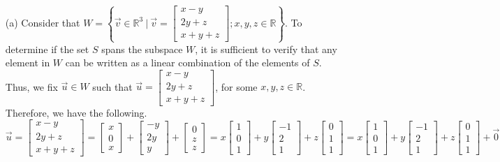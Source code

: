 \begin{SaveQuestion}
\begin{enumerate}
        \begin{itemize}
            \item[(a)] Consider that $W = \left\{\vec v \in \mathbb{R}^3 \ | \ \vec v = \begin{bmatrix}  x-y  \\ 2y+z \\ x+ y+ z \end{bmatrix}; x,y,z \in \mathbb{R}\right\}$. To determine if the set  $S$ spans the subspace $W$, it is sufficient to verify that any element in $W$ can be written as a linear combination of the elements of $S$. Thus, we fix $\vec u \in W$ such that $\vec u = \begin{bmatrix}  x-y  \\ 2y+z \\ x+ y+ z \end{bmatrix}$, for some $x,y,z \in \mathbb{R}$. Therefore, we have the following.
            $$\vec u =  \begin{bmatrix}  x-y  \\ 2y+z \\ x+ y+ z \end{bmatrix} = \begin{bmatrix} x \\ 0 \\ x \end{bmatrix} + \begin{bmatrix} -y \\ 2y \\ y \end{bmatrix} + \begin{bmatrix} 0 \\ z \\ z \end{bmatrix} = x\begin{bmatrix} 1 \\ 0 \\ 1 \end{bmatrix} + y\begin{bmatrix} -1 \\ 2 \\ 1 \end{bmatrix} + z\begin{bmatrix} 0 \\ 1 \\ 1 \end{bmatrix} = x\begin{bmatrix} 1 \\ 0 \\ 1 \end{bmatrix} + y\begin{bmatrix} -1 \\ 2 \\ 1 \end{bmatrix} + z\begin{bmatrix} 0 \\ 1 \\ 1 \end{bmatrix} + \vec 0$$

\end{itemize}
\end{enumerate}
\end{SaveQuestion}
